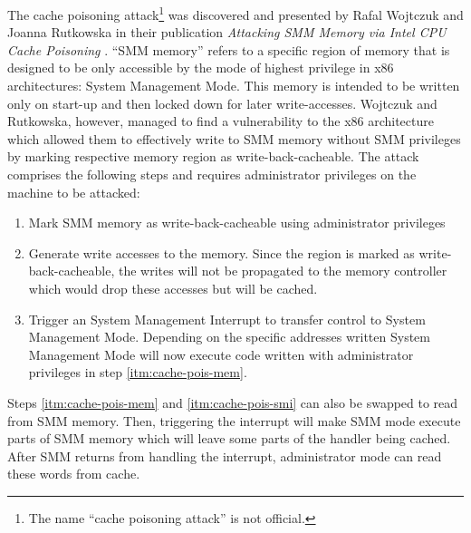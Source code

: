 The cache poisoning attack\footnote{%
    The name \enquote{cache poisoning attack} is not official.
} was discovered and presented by Rafal Wojtczuk and Joanna Rutkowska in their publication \textit{Attacking SMM Memory via Intel CPU Cache Poisoning} \cite{Wojtczuk09}.
\enquote{SMM memory} refers to a specific region of memory that is designed to be only accessible by the mode of highest privilege in x86 architectures: System Management Mode.
This memory is intended to be written only on start-up and then locked down for later write-accesses.
Wojtczuk and Rutkowska, however, managed to find a vulnerability to the x86 architecture which allowed them to effectively write to SMM memory without SMM privileges by marking respective memory region as write-back-cacheable.
The attack comprises the following steps and requires administrator privileges on the machine to be attacked:
\begin{enumerate}
    \item Mark SMM memory as write-back-cacheable using administrator privileges
    \item \label{itm:cache-pois-mem}
    Generate write accesses to the memory.
    Since the region is marked as write-back-cacheable, the writes will not be propagated to the memory controller which would drop these accesses but will be cached.
    \item \label{itm:cache-pois-smi}
    Trigger an System Management Interrupt to transfer control to System Management Mode.
    Depending on the specific addresses written System Management Mode will now execute code written with administrator privileges in step \ref{itm:cache-pois-mem}.
\end{enumerate}

Steps \ref{itm:cache-pois-mem} and \ref{itm:cache-pois-smi} can also be swapped to read from SMM memory.
Then, triggering the interrupt will make SMM mode execute parts of SMM memory which will leave some parts of the handler being cached.
After SMM returns from handling the interrupt, administrator mode can read these words from cache.

